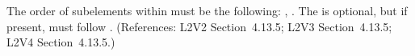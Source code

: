 The order of subelements within \KineticLaw must be the following:
, .  The  is
optional, but if present, must follow .  (References: L2V2
Section~4.13.5; L2V3 Section~4.13.5; L2V4 Section~4.13.5.)
